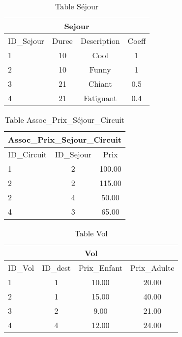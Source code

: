 
\begin{table}[h]
\begin{center}
\begin{tabular}{|l|c|c|c|}
\hline
\multicolumn{4}{|c|}{Sejour}\\
\hline
ID\_Sejour& Duree & Description& Coeff\\
\hline
1 & 10& Cool & 1\\
\hline
2 & 10& Funny& 1\\
\hline
3 & 21& Chiant& 0.5\\
\hline
4 & 21& Fatiguant& 0.4\\
\hline
\end{tabular}
\end{center}
\caption{Table Séjour}
\end{table}


\begin{table}[h]
\begin{center}
\begin{tabular}{|l|c|c|}
\hline
\multicolumn{3}{|c|}{Assoc\_Prix\_Sejour\_Circuit}\\
\hline
ID\_Circuit& ID\_Sejour & Prix\\
\hline
1 & 2& 100.00\\
\hline
2 & 2& 115.00\\
\hline
2 & 4& 50.00\\
\hline
4 & 3& 65.00\\
\hline
\end{tabular}
\end{center}
\caption{Table Assoc\_Prix\_Séjour\_Circuit}
\end{table}
\newpage

\begin{table}[h]
\begin{center}
\begin{tabular}{|l|c|c|c|}
\hline
\multicolumn{4}{|c|}{Vol}\\
\hline
ID\_Vol& ID\_dest & Prix\_Enfant& Prix\_Adulte\\
\hline
1 & 1& 10.00 & 20.00\\
\hline
2 & 1& 15.00& 40.00\\
\hline
3 & 2& 9.00& 21.00\\
\hline
4 & 4& 12.00& 24.00\\
\hline
\end{tabular}
\end{center}
\caption{Table Vol}
\end{table}

